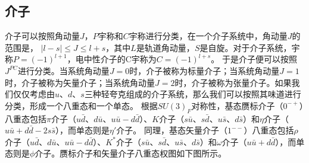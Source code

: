 \subsection{介子}
介子可以按照角动量$J$，$P$宇称和$C$宇称进行分类，在一个介子系统中，角动量$J$的范围是， $|l-s|\leq J \leq l+s$，其中$L$是轨道角动量，$S$是自旋。对于介子系统，宇称$P=(-1)^{l+1}$，电中性介子的C宇称为$C=(-1)^{l+s}$。
于是介子便可以按照$J^{PC}$进行分类。当系统角动量$J=0$时，介子被称为标量介子；当系统角动量$J=1$时，介子被称为矢量介子；当系统角动量$J=2$时，介子被称为张量介子。如果我们仅仅考虑由$u$、$d$、$s$三种轻夸克组成的介子系统，那么我们可以按照其味道进行分类，形成一个八重态和一个单态。
根据$SU(3)_F$对称性，基态赝标介子（$0^{-+}$）八重态包括$\pi$介子（$u\bar{d}$、$d\bar{u}$、$u\bar{u}-d\bar{d}$）、$K$介子（$s\bar{u}$、$s\bar{d}$、$u\bar{s}$、$d\bar{s}$）和$\eta$介子（$u\bar{u}+d\bar{d}-2s\bar{s}$），而单态则是$\eta'$介子。
同理，基态矢量介子（$1^{--}$）八重态包括$\rho$介子（$u\bar{d}$、$d\bar{u}$、$u\bar{u}-d\bar{d}$）、$K^*$介子（$s\bar{u}$、$s\bar{d}$、$u\bar{s}$、$d\bar{s}$）和$\omega$介子（$u\bar{u}+d\bar{d}$），而单态则是$\phi$介子。赝标介子和矢量介子八重态权图如下图所示。\\


